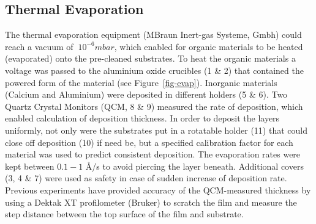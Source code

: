 \documentclass[
  letterpaper,
  DIV=11,
  numbers=noendperiod,
  oneside]{scrreprt}
\begin{document}
\hypertarget{thermal-evaporation}{%
\subsection{Thermal Evaporation}\label{thermal-evaporation}}

The thermal evaporation equipment (MBraun Inert-gas Systeme, Gmbh) could
reach a vacuum of \(~10^{-6} mbar\), which enabled for organic materials
to be heated (evaporated) onto the pre-cleaned substrates. To heat the
organic materials a voltage was passed to the aluminium oxide crucibles
(1 \& 2) that contained the powered form of the material (see
Figure~\ref{fig-evap}). Inorganic materials (Calcium and Aluminium) were
deposited in different holders (5 \& 6). Two Quartz Crystal Monitors
(QCM, 8 \& 9) measured the rate of deposition, which enabled calculation
of deposition thickness. In order to deposit the layers uniformly, not
only were the substrates put in a rotatable holder (11) that could close
off deposition (10) if need be, but a specified calibration factor for
each material was used to predict consistent deposition. The evaporation
rates were kept between \(0.1-1\) Å/s to avoid piercing the layer
beneath. Additional covers (3, 4 \& 7) were used as safety in case of
sudden increase of deposition rate. Previous experiments have provided
accuracy of the QCM-measured thickness by using a Dektak XT profilometer
(Bruker) to scratch the film and measure the step distance between the
top surface of the film and substrate.
\end{document}
